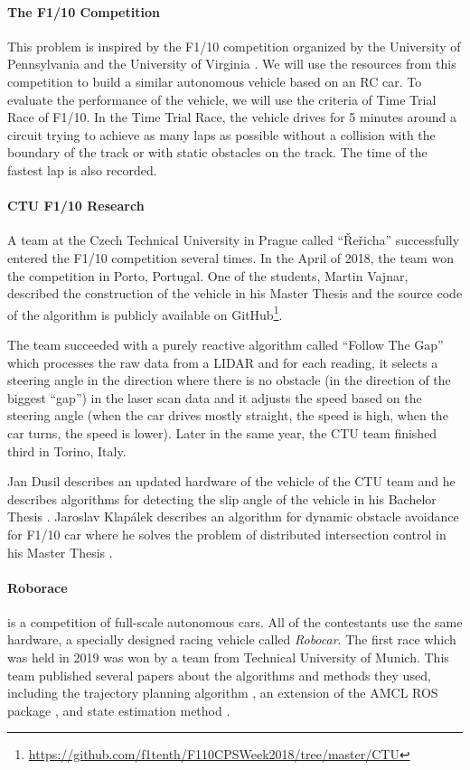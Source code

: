 \paragraph{The F1/10 Competition}

This problem is inspired by the F1/10 competition organized by the University of Pennsylvania and the University of Virginia \cite{F1/10_web}. We will use the resources from this competition to build a similar autonomous vehicle based on an RC car. To evaluate the performance of the vehicle, we will use the criteria of Time Trial Race of F1/10. In the Time Trial Race, the vehicle drives for 5 minutes around a circuit trying to achieve as many laps as possible without a collision with the boundary of the track or with static obstacles on the track. The time of the fastest lap is also recorded.

\paragraph{CTU F1/10 Research} A team at the Czech Technical University in Prague called ``Řeřicha'' successfully entered the F1/10 competition several times. In the April of 2018, the team won the competition in Porto, Portugal. One of the students, Martin Vajnar, described the construction of the vehicle in his Master Thesis \cite{ctu_martin_vajnar} and the source code of the algorithm is publicly available on GitHub\footnote{\url{https://github.com/f1tenth/F110CPSWeek2018/tree/master/CTU}}.

The team succeeded with a purely reactive algorithm called ``Follow The Gap'' which processes the raw data from a LIDAR and for each reading, it selects a steering angle in the direction where there is no obstacle (in the direction of the biggest ``gap'') in the laser scan data and it adjusts the speed based on the steering angle (when the car drives mostly straight, the speed is high, when the car turns, the speed is lower). Later in the same year, the CTU team finished third in Torino, Italy.

Jan Dusil describes an updated hardware of the vehicle of the CTU team and he describes algorithms for detecting the slip angle of the vehicle in his Bachelor Thesis \cite{ctu_jan_dusil}. Jaroslav Klapálek describes an algorithm for dynamic obstacle avoidance for F1/10 car where he solves the problem of distributed intersection control in his Master Thesis \cite{ctu_jaroslav_klapalek}.

\paragraph{Roborace} is a competition of full-scale autonomous cars. All of the contestants use the same hardware, a specially designed racing vehicle called \textit{Robocar}. The first race which was held in 2019 was won by a team from Technical University of Munich. This team published several papers about the algorithms and methods they used, including the trajectory planning algorithm \cite{tum_roborace_planning}, an extension of the AMCL ROS package \cite{tum_roborace_ros}, and state estimation method \cite{tum_roborace_state_estimation}.